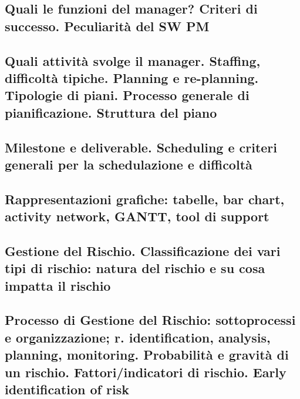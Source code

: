 \subsection{Quali le funzioni del manager? Criteri di successo. Peculiarità del SW PM}
\subsection{Quali attività svolge il manager. Staffing, difficoltà tipiche. Planning e re-planning. Tipologie di piani. Processo generale di pianificazione. Struttura del piano}
\subsection{Milestone e deliverable. Scheduling e criteri generali per la schedulazione e difficoltà}
\subsection{Rappresentazioni grafiche: tabelle, bar chart, activity network, GANTT, tool di support}
\subsection{Gestione del Rischio. Classificazione dei vari tipi di rischio: natura del rischio e su cosa impatta il rischio}
\subsection{Processo di Gestione del Rischio: sottoprocessi e organizzazione; r. identification, analysis, planning, monitoring. Probabilità e gravità di un rischio. Fattori/indicatori di rischio. Early identification of risk}